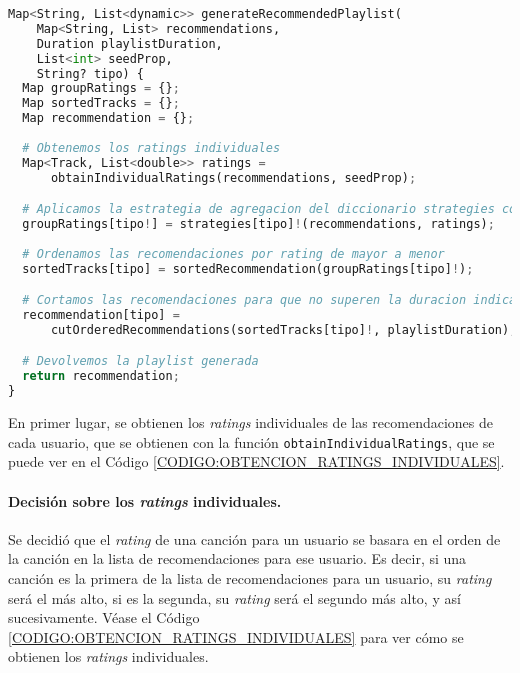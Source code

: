 \begin{lstlisting}[language=python, caption=Proceso de agregación, label=CODIGO:AGREGADOR]
Map<String, List<dynamic>> generateRecommendedPlaylist(
    Map<String, List> recommendations,
    Duration playlistDuration,
    List<int> seedProp,
    String? tipo) {
  Map groupRatings = {};
  Map sortedTracks = {};
  Map recommendation = {};
  
  # Obtenemos los ratings individuales
  Map<Track, List<double>> ratings =
      obtainIndividualRatings(recommendations, seedProp);

  # Aplicamos la estrategia de agregacion del diccionario strategies correspondiente
  groupRatings[tipo!] = strategies[tipo]!(recommendations, ratings);
  
  # Ordenamos las recomendaciones por rating de mayor a menor
  sortedTracks[tipo] = sortedRecommendation(groupRatings[tipo]!);

  # Cortamos las recomendaciones para que no superen la duracion indicada por el usuario
  recommendation[tipo] =
      cutOrderedRecommendations(sortedTracks[tipo]!, playlistDuration);

  # Devolvemos la playlist generada
  return recommendation;
}

\end{lstlisting}

En primer lugar, se obtienen los \textit{ratings} individuales de las recomendaciones de cada usuario, que se obtienen con la función
 \texttt{obtainIndividualRatings}, que se puede ver en el Código \ref{CODIGO:OBTENCION_RATINGS_INDIVIDUALES}. 

\paragraph{Decisión sobre los \textit{ratings} individuales.}

Se decidió que el \textit{rating} de una canción para un usuario se basara en el orden de la canción en la lista de recomendaciones para ese usuario.
Es decir, si una canción es la primera de la lista de recomendaciones para un usuario, su \textit{rating} será el más alto, si es la segunda, su \textit{rating}
será el segundo más alto, y así sucesivamente. Véase el Código \ref{CODIGO:OBTENCION_RATINGS_INDIVIDUALES} para ver cómo se obtienen los \textit{ratings} individuales.

